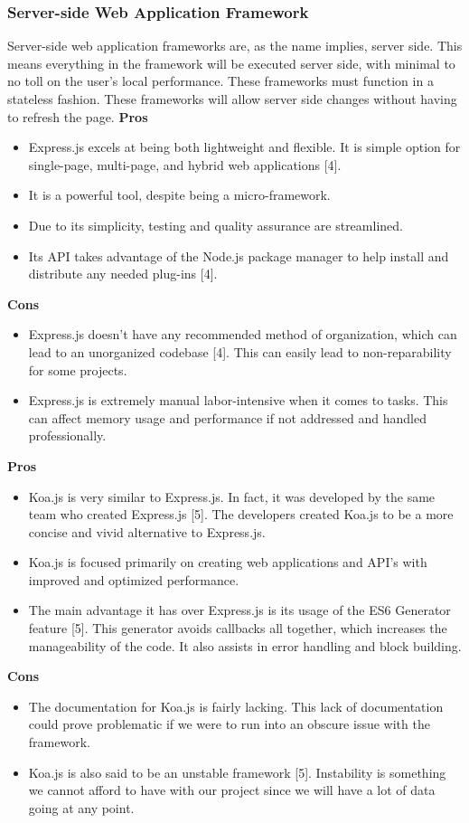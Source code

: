\subsubsection{Server-side Web Application Framework}
Server-side web application frameworks are, as the name implies, server side. This means everything in the framework will be executed server side, with minimal to no toll on the user's local performance. These frameworks must function in a stateless fashion. These frameworks will allow server side changes without having to refresh the page.
			\textbf{Pros}
			\begin{itemize}
				\item Express.js excels at being both lightweight and flexible. It is simple option for single-page, multi-page, and hybrid web applications [4]. 
				\item It is a powerful tool, despite being a micro-framework. 
				\item Due to its simplicity, testing and quality assurance are streamlined. 
				\item Its API takes advantage of the Node.js package manager to help install and distribute any needed plug-ins [4].
			\end{itemize}	
		\textbf{Cons}
			\begin{itemize}
				\item Express.js doesn't have any recommended method of organization, which can lead to an unorganized codebase [4]. This can easily lead to non-reparability for some projects. 
				\item Express.js is extremely manual labor-intensive when it comes to tasks. This can affect memory usage and performance if not addressed and handled professionally.
			\end{itemize}	
	
		\textbf{Pros}
			\begin{itemize}
				\item Koa.js is very similar to Express.js. In fact, it was developed by the same team who created Express.js [5]. The developers created Koa.js to be a more concise and vivid alternative to Express.js. 
				\item Koa.js is focused primarily on creating web applications and API's with improved and optimized performance. 
				\item The main advantage it has over Express.js is its usage of the ES6 Generator feature [5]. This generator avoids callbacks all together, which increases the manageability of the code. It also assists in error handling and block building.
			\end{itemize}	
		\textbf{Cons}
			\begin{itemize}
				\item The documentation for Koa.js is fairly lacking. This lack of documentation could prove problematic if we were to run into an obscure issue with the framework. 
				\item Koa.js is also said to be an unstable framework [5]. Instability is something we cannot afford to have with our project since we will have a lot of data going at any point.
			\end{itemize}	
	
